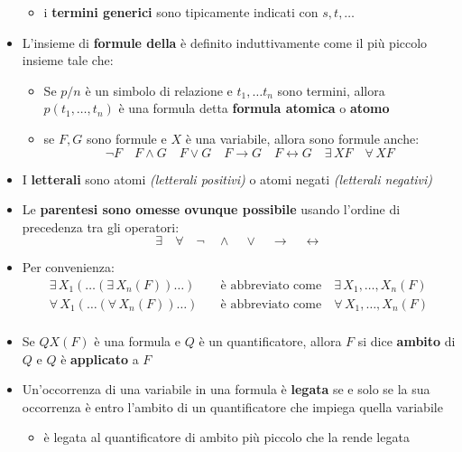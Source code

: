 \documentclass[italian, 10pt]{article}
\begin{document}
\begin{itemize}
\begin{itemize}
\begin{enumerate}
                \end{enumerate}
          \item i \textbf{termini generici} sono tipicamente indicati con \(s, t, \ldots\)
        \end{itemize}
  \item L'insieme di \textbf{formule della \FOL} è definito induttivamente come il più piccolo insieme tale che:
        \begin{itemize}
          \item Se \(p/n\) è un simbolo di relazione e \(t_1, \ldots t_n\) sono termini, allora \(p(t_1, \ldots, t_n)\) è una formula detta \textbf{formula atomica} o \textbf{atomo}
          \item se \(F, G\) sono formule e \(X\) è una variabile, allora sono formule anche:
                \[\lnot F \quad F \land G \quad F \lor G \quad F \rightarrow G \quad F \leftrightarrow G \quad \exists \, X F \quad \forall \, X F \]
        \end{itemize}
  \item I \textbf{letterali} sono atomi \textit{(letterali positivi)} o atomi negati \textit{(letterali negativi)}
  \item Le \textbf{parentesi sono omesse ovunque possibile} usando l'ordine di precedenza tra gli operatori:
        \[ \exists \quad \forall \quad \lnot \quad \land \quad \lor \quad \rightarrow \quad \leftrightarrow\]
  \item Per convenienza:
        \begin{align*}
          \exists \, X_1 \left(\ldots \left(\exists \, X_n (F) \right) \ldots \right) \quad & \text{è abbreviato come} \quad \exists \, X_1, \ldots, X_n(F) \\
          \forall \, X_1 \left(\ldots \left(\forall \, X_n (F) \right) \ldots \right) \quad & \text{è abbreviato come} \quad \forall \, X_1, \ldots, X_n(F) \\
        \end{align*}
  \item Se \(QX(F)\) è una formula e \(Q\) è un quantificatore, allora \(F\) si dice \textbf{ambito} di \(Q\) e \(Q\) è \textbf{applicato} a \(F\)
  \item Un'occorrenza di una variabile in una formula è \textbf{legata} se e solo se la sua occorrenza è entro l'ambito di un quantificatore che impiega quella variabile
        \begin{itemize}[label=\(\rightarrow\)]
          \item è legata al quantificatore di ambito più piccolo che la rende legata

\end{itemize}
\end{itemize}
\end{document}
